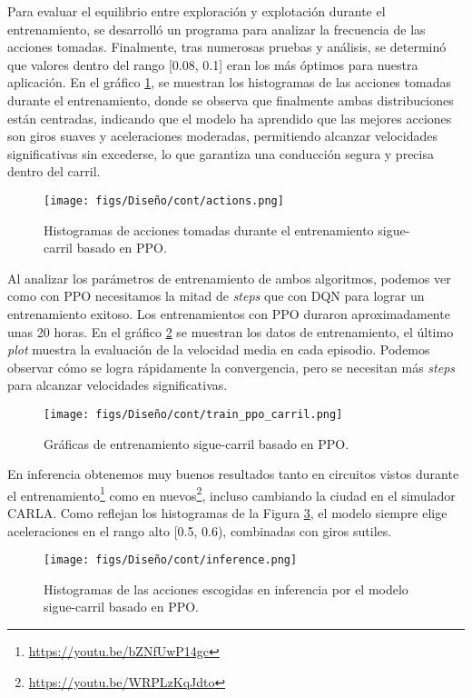 Para evaluar el equilibrio entre exploración y explotación durante el entrenamiento, se desarrolló un programa para analizar la frecuencia de las acciones tomadas. Finalmente, tras numerosas pruebas y análisis, se determinó que valores dentro del rango [0.08, 0.1] eran los más óptimos para nuestra aplicación. En el gráfico \ref{fig:actions_ppo_carril}, se muestran los histogramas de las acciones tomadas durante el entrenamiento, donde se observa que finalmente ambas distribuciones están centradas, indicando que el modelo ha aprendido que las mejores acciones son giros suaves y aceleraciones moderadas, permitiendo alcanzar velocidades significativas sin excederse, lo que garantiza una conducción segura y precisa dentro del carril.

\begin{figure}[ht]
  \centering
  \texttt{[image: figs/Diseño/cont/actions.png]}
  \caption{Histogramas de acciones tomadas durante el entrenamiento sigue-carril basado en \ac{PPO}.}
  \label{fig:actions_ppo_carril}
\end{figure}

\newpage

Al analizar los parámetros de entrenamiento de ambos algoritmos, podemos ver como con \ac{PPO} necesitamos la mitad de \textit{steps} que con \ac{DQN} para lograr un entrenamiento exitoso. Los entrenamientos con \ac{PPO} duraron aproximadamente unas 20 horas. En el gráfico \ref{fig:train_ppo_carril} se muestran los datos de entrenamiento, el último \textit{plot} muestra la evaluación de la velocidad media en cada episodio. Podemos observar cómo se logra rápidamente la convergencia, pero se necesitan más \textit{steps} para alcanzar velocidades significativas.
\begin{figure}[ht]
  \centering
  \texttt{[image: figs/Diseño/cont/train\_ppo\_carril.png]}
  \caption{Gráficas de entrenamiento sigue-carril basado en \ac{PPO}.}
  \label{fig:train_ppo_carril}
\end{figure}

En inferencia obtenemos muy buenos resultados tanto en circuitos vistos durante el entrenamiento\footnote{\url{https://youtu.be/bZNfUwP14gc}} como en nuevos\footnote{\url{https://youtu.be/WRPLzKqJdto}}, incluso cambiando la ciudad en el simulador CARLA. Como reflejan los histogramas de la Figura \ref{fig:inference_ppo_carril},  el modelo siempre elige aceleraciones en el rango alto [0.5, 0.6), combinadas con giros sutiles.
\begin{figure}[ht]
\centering
\texttt{[image: figs/Diseño/cont/inference.png]}
\caption{Histogramas de las acciones escogidas en inferencia por el modelo sigue-carril basado en \ac{PPO}.}
\label{fig:inference_ppo_carril}
\end{figure} 


